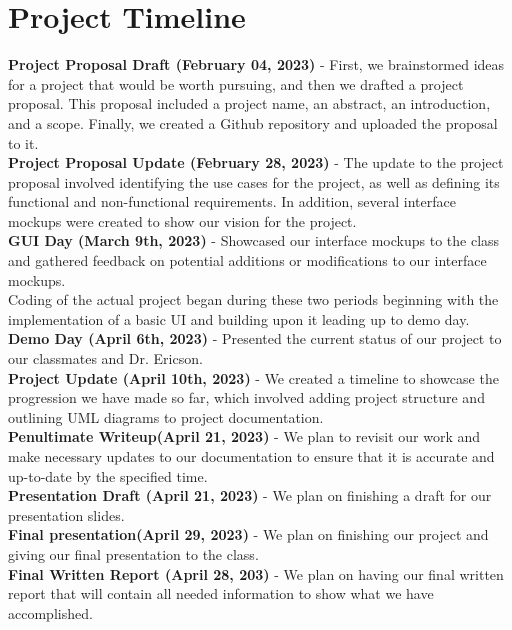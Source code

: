 \documentclass[10pt,conference,onecolumn,compsoc]{IEEEtran}
\begin{document}
\section{Project Timeline}
\textbf{Project Proposal Draft (February 04, 2023)} - First, we brainstormed ideas for a project that would be worth pursuing, and then we drafted a project proposal. This proposal included a project name, an abstract, an introduction, and a scope. Finally, we created a Github repository and uploaded the proposal to it.
\\[10pt]
\textbf{Project Proposal Update (February 28, 2023)} - The update to the project proposal involved identifying the use cases for the project, as well as defining its functional and non-functional requirements. In addition, several interface mockups were created to show our vision for the project.
\\[10pt]
\textbf{GUI Day (March 9th, 2023)}  - Showcased our interface mockups to the class and gathered feedback on potential additions or modifications to our interface mockups.
\\[10pt]
Coding of the actual project began during these two periods beginning with the implementation of a basic UI and building upon it leading up to demo day.
\\[10pt]
\textbf{Demo Day (April 6th, 2023)} - Presented the current status of our project to our classmates and Dr. Ericson.
\\[10pt]
\textbf{Project Update (April 10th, 2023)} - We created a timeline to showcase the progression we have made so far, which involved adding project structure and outlining UML diagrams to project documentation.
\\[10pt]
\textbf{Penultimate Writeup(April 21, 2023)} - We plan to revisit our work and make necessary updates to our documentation to ensure that it is accurate and up-to-date by the specified time.
\\[10pt]
\textbf{Presentation Draft (April 21, 2023)} - We plan on finishing a draft for our presentation slides.
\\[10pt]
\textbf{Final presentation(April 29, 2023)} - We plan on finishing our project and giving our final presentation to the class.
\\[10pt]
\textbf{Final Written Report (April 28, 203)} - We plan on having our final written report that will contain all needed information to show what we have accomplished.
\end{document}
